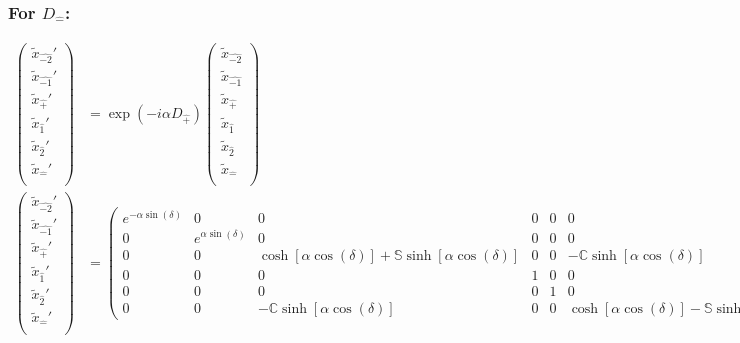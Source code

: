 \documentclass[]{article}
\numberwithin{equation}{section}
\begin{document}
{{\subsubsection{For $D_{\hat{-}}$:}
\begin{align}
\begin{pmatrix}
    \tilde{x}_{\hat{-2}}'\\
    \tilde{x}_{\hat{-1}}'\\
    \tilde{x}_{\hat{+}}'\\
    \tilde{x}_{\hat{1}}'\\
    \tilde{x}_{\hat{2}}'\\
    \tilde{x}_{\hat{-}}'\\
    \end{pmatrix}&= \exp{(-i\alpha D_{\hat{+}})}\begin{pmatrix}
    \tilde{x}_{\hat{-2}}\\
    \tilde{x}_{\hat{-1}}\\
    \tilde{x}_{\hat{+}}\\
    \tilde{x}_{\hat{1}}\\
    \tilde{x}_{\hat{2}}\\
    \tilde{x}_{\hat{-}}\\
    \end{pmatrix}\\
    \begin{pmatrix}
    \tilde{x}_{\hat{-2}}'\\
    \tilde{x}_{\hat{-1}}'\\
    \tilde{x}_{\hat{+}}'\\
    \tilde{x}_{\hat{1}}'\\
    \tilde{x}_{\hat{2}}'\\
    \tilde{x}_{\hat{-}}'\\
    \end{pmatrix}&= \begin{pmatrix}
        e^{-\alpha\sin{(\delta)}}&0&0&0&0&0\\
        0&e^{\alpha\sin{(\delta)}}&0&0&0&0\\
        0&0&\cosh[\alpha\cos{(\delta)}]+\mathbb{S}\sinh[\alpha\cos{(\delta)}]&0&0&-\mathbb{C}\sinh[\alpha\cos{(\delta)}]\\
        0&0&0&1&0&0\\
        0&0&0&0&1&0\\
        0&0&-\mathbb{C}\sinh[\alpha\cos{(\delta)}]&0&0&\cosh[\alpha\cos{(\delta)}]-\mathbb{S}\sinh[\alpha\cos{(\delta)}]
    \end{pmatrix}\begin{pmatrix}

\end{pmatrix}
\end{align}}}
\end{document}
